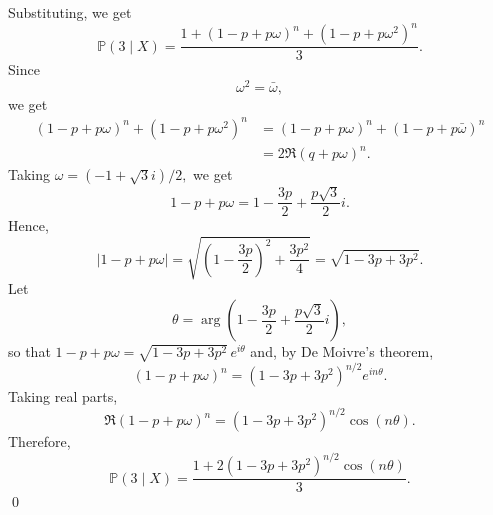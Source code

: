 \documentclass[12p]{article}
\begin{document}
\begin{enumerate}
\begin{enumerate}
    Substituting, we get
    $$
    \mathbb P(3 \mid X) = \dfrac{1 + (1 -p + p\omega)^{n} + (1-p +
    p\omega^2)^n}{3}.
    $$
    Since
    $$
    \omega^2 = \bar \omega,
    $$
    we get
    \begin{align*}
      (1 - p + p\omega)^n + (1- p + p \omega^2)^n &= (1- p +
      p\omega)^n + (1 - p + p \bar\omega)^n \\
      &=2 \Re (q  + p\omega)^n.
    \end{align*}
    Taking $\omega = (-1 + \sqrt3 i)/2,$ we get
    $$
    1 - p + p\omega = 1 - \dfrac{3p}{2} + \dfrac{p\sqrt{3}}{2} i.
    $$
    Hence,
    $$
    |1 - p + p \omega| = \sqrt{\left(1 - \dfrac{3p}{2}\right)^2 +
    \dfrac{3p^2}{4}} = \sqrt{1 - 3p + 3p^2}.
    $$
    Let
    $$
    \theta = \arg\left(1 - \dfrac{3p}{2} + \dfrac{p\sqrt3}{2} i\right),
    $$
    so that $1 - p + p\omega = \sqrt{1 - 3p + 3p^2}\, e^{i\theta}$
    and, by De Moivre's theorem,
    $$
    (1 - p + p\omega)^n = \left(1 - 3p + 3p^2\right)^{n/2} e^{in\theta}.
    $$
    Taking real parts,
    $$
    \Re (1 - p + p\omega)^n = \left(1 - 3p + 3p^2\right)^{n/2} \cos(n\theta).
    $$
    Therefore,
    $$
    \mathbb P(3 \mid X) = \dfrac{1 + 2\left(1 - 3p +
    3p^2\right)^{n/2} \cos(n\theta)}{3}.
    $$
    \qed
\end{enumerate}
\end{enumerate}
\end{document}
